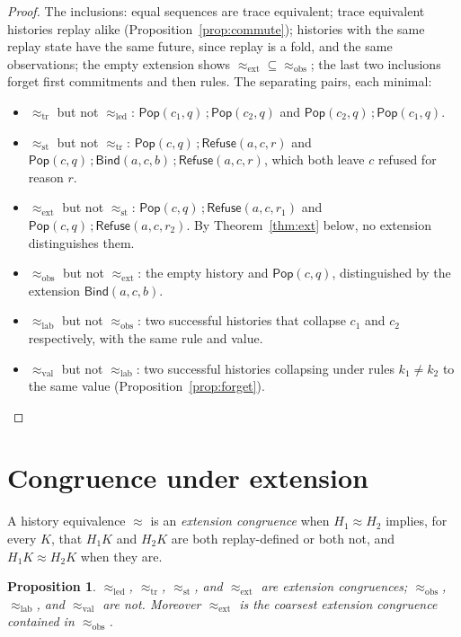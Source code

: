\documentclass[11pt,openany]{book}
\newtheorem{proposition}[theorem]{Proposition}
\theoremstyle{remark}
\newcommand{\Pop}{\mathsf{Pop}}
\newcommand{\Refuse}{\mathsf{Refuse}}
\newcommand{\Bind}{\mathsf{Bind}}
\begin{document}
\begin{proof}
The inclusions: equal sequences are trace equivalent; trace equivalent
histories replay alike (Proposition~\ref{prop:commute}); histories with
the same replay state have the same future, since replay is a fold, and
the same observations; the empty extension shows
$\approx_{\mathrm{ext}}\subseteq\approx_{\mathrm{obs}}$; the last two
inclusions forget first commitments and then rules. The separating pairs,
each minimal:
\begin{itemize}[leftmargin=1.5em]
\item $\approx_{\mathrm{tr}}$ but not $\approx_{\mathrm{led}}$:
$\Pop(c_1,q)\,;\Pop(c_2,q)$ and $\Pop(c_2,q)\,;\Pop(c_1,q)$.
\item $\approx_{\mathrm{st}}$ but not $\approx_{\mathrm{tr}}$:
$\Pop(c,q)\,;\Refuse(a,c,r)$ and
$\Pop(c,q)\,;\Bind(a,c,b)\,;\Refuse(a,c,r)$, which both leave $c$
refused for reason $r$.
\item $\approx_{\mathrm{ext}}$ but not $\approx_{\mathrm{st}}$:
$\Pop(c,q)\,;\Refuse(a,c,r_1)$ and $\Pop(c,q)\,;\Refuse(a,c,r_2)$. By
Theorem~\ref{thm:ext} below, no extension distinguishes them.
\item $\approx_{\mathrm{obs}}$ but not $\approx_{\mathrm{ext}}$: the empty
history and $\Pop(c,q)$, distinguished by the extension $\Bind(a,c,b)$.
\item $\approx_{\mathrm{lab}}$ but not $\approx_{\mathrm{obs}}$: two
successful histories that collapse $c_1$ and $c_2$ respectively, with the
same rule and value.
\item $\approx_{\mathrm{val}}$ but not $\approx_{\mathrm{lab}}$: two
successful histories collapsing under rules $k_1\ne k_2$ to the same value
(Proposition~\ref{prop:forget}).\qedhere
\end{itemize}
\end{proof}

\section{Congruence under extension}

A history equivalence $\approx$ is an \emph{extension congruence} when
$H_1\approx H_2$ implies, for every $K$, that $H_1K$ and $H_2K$ are both
replay-defined or both not, and $H_1K\approx H_2K$ when they are.

\begin{proposition}\label{prop:extcong}
$\approx_{\mathrm{led}}$, $\approx_{\mathrm{tr}}$, $\approx_{\mathrm{st}}$,
and $\approx_{\mathrm{ext}}$ are extension congruences;
$\approx_{\mathrm{obs}}$, $\approx_{\mathrm{lab}}$, and
$\approx_{\mathrm{val}}$ are not. Moreover $\approx_{\mathrm{ext}}$ is the
coarsest extension congruence contained in $\approx_{\mathrm{obs}}$.
\end{proposition}
\end{document}
